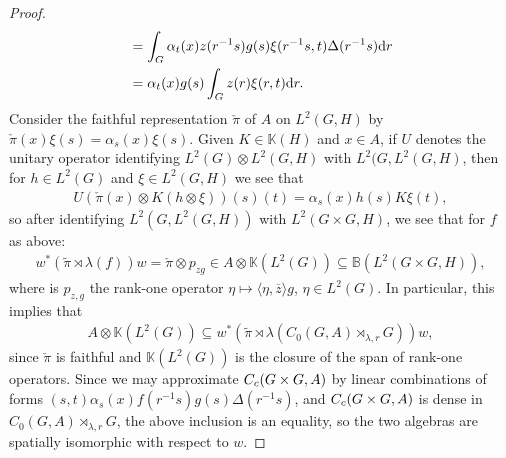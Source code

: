 \begin{proof}
\begin{align*}
	&= \int_G \alpha_t(x) z(r^{-1}s) g(s) \xi(r^{-1}s,t) \Delta(r^{-1}s)  \mathrm{d} r\\
	&= \alpha_t(x) g(s) \int_G z(r) \xi(r,t) \mathrm{d} r.
\end{align*}
Consider the faithful representation $\check \pi$ of $A$ on $L^2(G,H)$ by $\check \pi(x) \xi(s) = \alpha_s(x) \xi(s)$. Given $K \in \mathbb{K}(H)$ and $x \in A$, if $U$ denotes the unitary operator identifying $L^2(G) \otimes L^2(G,H)$ with $L^2(G, L^2(G, H)$, then for $h \in L^2(G)$ and $\xi \in L^2(G,H)$ we see that
\begin{align*}
	U (\check \pi(x) \otimes K (h \otimes \xi))(s)(t) = \alpha_s(x) h(s) K \xi(t),
\end{align*}
so after identifying $L^2(G,L^2(G,H))$ with $L^2(G \times G,H)$, we see that for $f$ as above:
\begin{align*}
	w^* (\tilde \pi \rtimes \lambda (f)) w  = \check \pi \otimes p_{zg} \in A \otimes \mathbb{K}(L^2(G)) \subseteq \mathbb{B}(L^2(G \times G, H)),
\end{align*}
where is $p_{z,g}$ the rank-one operator $\eta \mapsto \langle \eta , \overline z \rangle g$, $\eta \in L^2(G)$.
In particular, this implies that 
\begin{align*}
	A \otimes \mathbb{K}(L^2(G)) \subseteq w^* (\tilde \pi \rtimes \lambda (C_0(G,A) \rtimes_{\lambda, r} G))w,
\end{align*}
since $\check \pi$ is faithful and $\mathbb{K}(L^2(G))$ is the closure of the span of rank-one operators. Since we may approximate $C_c(G \times G, A)$ by linear combinations of forms $(s,t)  \alpha_s(x)  f(r^{-1}s)g(s) \Delta(r^{-1}s)$, and $C_c(G \times G, A)$ is dense in $C_0(G,A) \rtimes_{\lambda, r}G$, the above inclusion is an equality, so the two algebras are spatially isomorphic with respect to $w$.


\end{proof}
